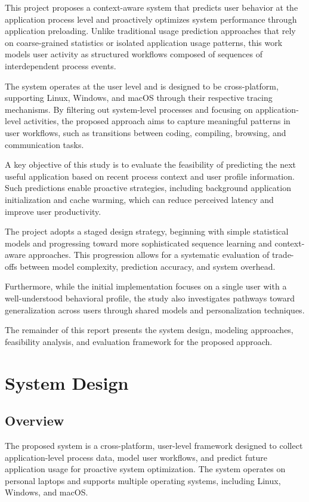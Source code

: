 \documentclass[11pt]{article}
\begin{document}
This project proposes a context-aware system that predicts user behavior at the application process level and proactively optimizes system performance through application preloading. Unlike traditional usage prediction approaches that rely on coarse-grained statistics or isolated application usage patterns, this work models user activity as structured workflows composed of sequences of interdependent process events.

The system operates at the user level and is designed to be cross-platform, supporting Linux, Windows, and macOS through their respective tracing mechanisms. By filtering out system-level processes and focusing on application-level activities, the proposed approach aims to capture meaningful patterns in user workflows, such as transitions between coding, compiling, browsing, and communication tasks.

A key objective of this study is to evaluate the feasibility of predicting the next useful application based on recent process context and user profile information. Such predictions enable proactive strategies, including background application initialization and cache warming, which can reduce perceived latency and improve user productivity.

The project adopts a staged design strategy, beginning with simple statistical models and progressing toward more sophisticated sequence learning and context-aware approaches. This progression allows for a systematic evaluation of trade-offs between model complexity, prediction accuracy, and system overhead.

Furthermore, while the initial implementation focuses on a single user with a well-understood behavioral profile, the study also investigates pathways toward generalization across users through shared models and personalization techniques.

The remainder of this report presents the system design, modeling approaches, feasibility analysis, and evaluation framework for the proposed approach.

\section{System Design}

\subsection{Overview}

The proposed system is a cross-platform, user-level framework designed to collect application-level process data, model user workflows, and predict future application usage for proactive system optimization. The system operates on personal laptops and supports multiple operating systems, including Linux, Windows, and macOS.
\end{document}

